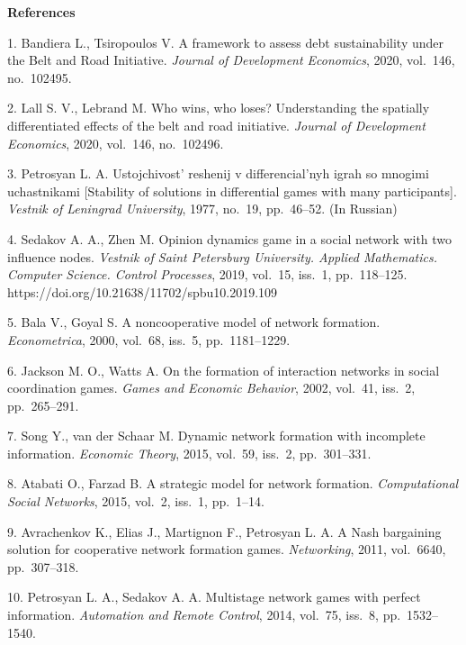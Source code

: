 

{\small



\vskip6mm

\noindent \textbf{References} }

\vskip 2mm

{\footnotesize



1. Bandiera L., Tsiropoulos V. A framework to assess debt sustainability under the Belt and Road Initiative. \textit{Journal of Development Economics}, 2020, vol.~146, no.~102495.

2. Lall S. V., Lebrand M. Who wins, who loses? Understanding the spatially differentiated effects of the belt and road initiative. \textit{Journal of Development Economics}, 2020, vol.~146, no.~102496.

3. Petrosyan L. A. Ustojchivost' reshenij v differencial'nyh igrah so mnogimi uchastnikami [Stability of solutions in differential games with many participants]. \textit{Vestnik of Leningrad University}, 1977, no.~19, pp.~46--52.  (In Russian)

4. Sedakov A. A., Zhen M. Opinion dynamics game in a social network with two influence nodes. \textit{Vestnik of Saint Petersburg University. Applied Mathematics. Computer Science. Control Processes}, 2019, vol.~15, iss.~1, pp.~118--125. https://doi.org/10.21638/11702/spbu10.2019.109

5. Bala V., Goyal S. A noncooperative model of network formation. \textit{Econometrica}, 2000, vol.~68, iss.~5, pp.~1181--1229.

6. Jackson M. O., Watts A. On the formation of interaction networks in social coordi\-na\-tion games. \textit{Games and Economic Behavior}, 2002, vol.~41, iss.~2, pp.~265--291.

7. Song Y., van der Schaar M. Dynamic network formation with incomplete information. \textit{Economic Theory}, 2015, vol.~59, iss.~2, pp.~301--331.

8. Atabati O., Farzad B. A strategic model for network formation. \textit{Computational Social Networks}, 2015, vol.~2, iss.~1, pp.~1--14.

9. Avrachenkov K., Elias J., Martignon F., Petrosyan L. A. A Nash bargaining solution for coope\-ra\-tive network formation games. \textit{Networking}, 2011, vol.~6640, pp.~307--318.

10. Petrosyan L. A., Sedakov A. A. Multistage network games with perfect information. \textit{Automation and Remote Control}, 2014, vol.~75, iss.~8, pp.~1532--1540.

}
